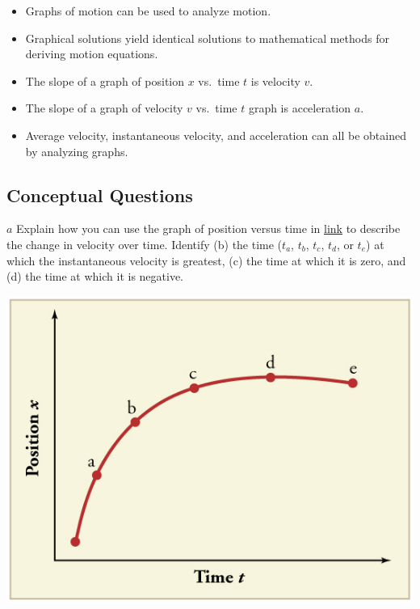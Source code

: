 \documentclass[
]{book}
\providecommand{\tightlist}{%
  \setlength{\itemsep}{0pt}\setlength{\parskip}{0pt}}
\begin{document}
\begin{itemize}
\tightlist
\item
  \protect\hypertarget{import-auto-id2388505}{}{Graphs of motion can be used to analyze
  motion.}
\item
  \protect\hypertarget{import-auto-id4097898}{}{Graphical solutions yield identical solutions to mathematical
  methods for deriving motion equations.}
\item
  \protect\hypertarget{import-auto-id2294483}{}{The slope of a graph of position \(x{}\) vs.~time \(t{}\) is velocity
  \(v{}\).}
\item
  \protect\hypertarget{import-auto-id2025741}{}{The slope of a graph of velocity
  \(v{}\)\emph{} vs.~time \(t{}\) graph is
  acceleration \(a{}\).}
\item
  \protect\hypertarget{import-auto-id1561758}{}{Average velocity, instantaneous velocity, and acceleration can all
  be obtained by analyzing graphs.}
\end{itemize}

\hypertarget{fs-id1773324}{}
\hypertarget{conceptual-questions-6}{%
\subsection{Conceptual Questions}\label{conceptual-questions-6}}

\hypertarget{fs-id1550042}{}
\leavevmode{}%
\(a\) Explain how you can use the graph of position versus time in
\protect\hyperlink{import-auto-id4064025}{link} to describe the
change in velocity over time. Identify (b) the time (\(t_{a}\), \(t_{b}\),
\(t_{c}\), \(t_{d}\), or \(t_{e}\)) at which the instantaneous velocity is
greatest, (c) the time at which it is zero, and (d) the time at which it
is negative.

\includegraphics{images/Figure_03_08Sol_01.jpg}
\end{document}
